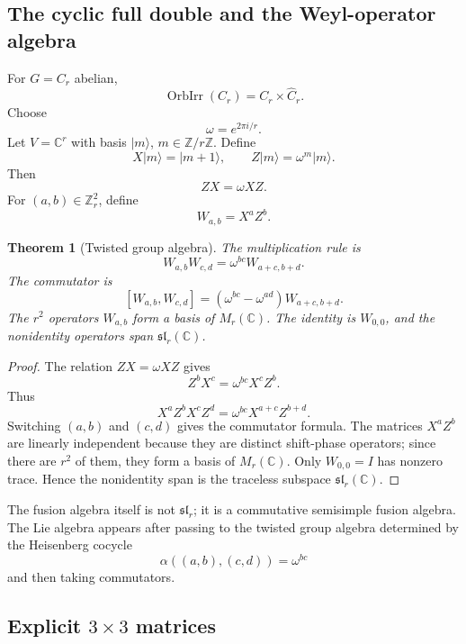 \documentclass[11pt]{article}
\newtheorem{theorem}{Theorem}[section]
\newcommand{\ZZ}{\mathbb Z}
\newcommand{\CC}{\mathbb C}
\begin{document}
\subsection{The cyclic full double and the Weyl-operator algebra}

For $G=C_r$ abelian,
\[
        \operatorname{OrbIrr}(C_r)=C_r\times\widehat C_r.
\]
Choose
\[
        \omega=e^{2\pi i/r}.
\]
Let $V=\CC^r$ with basis $|m\rangle$, $m\in\ZZ/r\ZZ$.  Define
\[
        X|m\rangle=|m+1\rangle,
        \qquad
        Z|m\rangle=\omega^m|m\rangle.
\]
Then
\[
        ZX=\omega XZ.
\]
For $(a,b)\in\ZZ_r^2$, define
\[
        W_{a,b}=X^aZ^b.
\]

\begin{theorem}[Twisted group algebra]
The multiplication rule is
\[
        W_{a,b}W_{c,d}=\omega^{bc}W_{a+c,b+d}.
\]
The commutator is
\[
        [W_{a,b},W_{c,d}]
        =\left(\omega^{bc}-\omega^{ad}\right)W_{a+c,b+d}.
\]
The $r^2$ operators $W_{a,b}$ form a basis of $M_r(\CC)$.  The identity is $W_{0,0}$, and the nonidentity operators span $\mathfrak{sl}_r(\CC)$.
\end{theorem}

\begin{proof}
The relation $ZX=\omega XZ$ gives
\[
        Z^bX^c=\omega^{bc}X^cZ^b.
\]
Thus
\[
        X^aZ^bX^cZ^d=\omega^{bc}X^{a+c}Z^{b+d}.
\]
Switching $(a,b)$ and $(c,d)$ gives the commutator formula.  The matrices $X^aZ^b$ are linearly independent because they are distinct shift-phase operators; since there are $r^2$ of them, they form a basis of $M_r(\CC)$.  Only $W_{0,0}=I$ has nonzero trace.  Hence the nonidentity span is the traceless subspace $\mathfrak{sl}_r(\CC)$.
\end{proof}

The fusion algebra itself is not $\mathfrak{sl}_r$; it is a commutative semisimple fusion algebra.  The Lie algebra appears after passing to the twisted group algebra determined by the Heisenberg cocycle
\[
        \alpha((a,b),(c,d))=\omega^{bc}
\]
and then taking commutators.

\subsection{Explicit $3\times3$ matrices}
\end{document}
